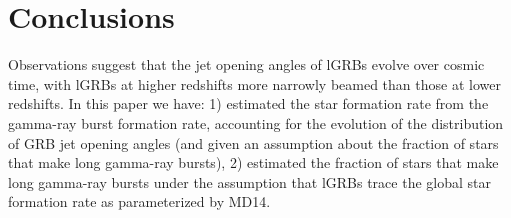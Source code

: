 \documentclass[fleqn,usenatbib,useAMS]{mnras}
\begin{document}
\section{Conclusions}

 Observations suggest that the jet opening angles of lGRBs evolve over cosmic time, with lGRBs at higher redshifts more narrowly beamed than those at lower redshifts.  In this paper we have: 1) estimated the star formation rate from the gamma-ray burst formation rate, accounting for the evolution of the distribution of GRB jet opening angles (and given an assumption about the fraction of stars that make long gamma-ray bursts), 2) estimated the fraction of stars that make long gamma-ray bursts under the assumption that lGRBs trace the global star formation rate as parameterized by MD14.\\  
\end{document}
